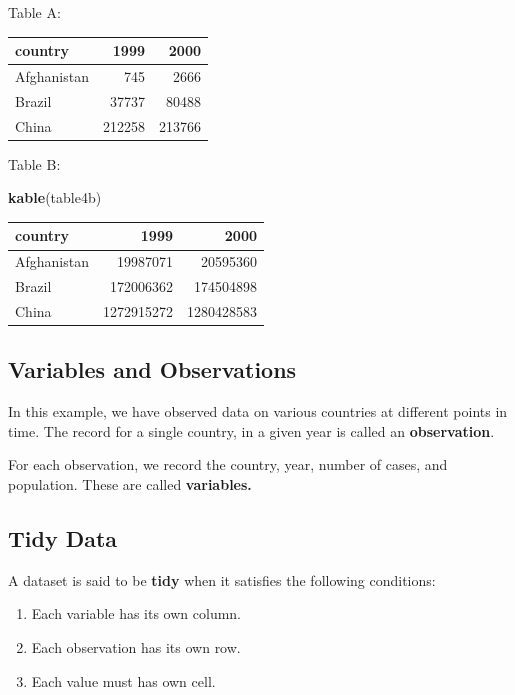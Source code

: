 \documentclass[]{book}
\newenvironment{Shaded}{\begin{snugshade}}{\end{snugshade}}
\newcommand{\KeywordTok}[1]{\textcolor[rgb]{0.13,0.29,0.53}{\textbf{#1}}}
\newcommand{\NormalTok}[1]{#1}
\providecommand{\tightlist}{%
  \setlength{\itemsep}{0pt}\setlength{\parskip}{0pt}}
\begin{document}
Table A:

\begin{tabular}{l|r|r}
\hline
country & 1999 & 2000\\
\hline
Afghanistan & 745 & 2666\\
\hline
Brazil & 37737 & 80488\\
\hline
China & 212258 & 213766\\
\hline
\end{tabular}

Table B:

\begin{Shaded}
\begin{Highlighting}[]
\KeywordTok{kable}\NormalTok{(table4b)}
\end{Highlighting}
\end{Shaded}

\begin{tabular}{l|r|r}
\hline
country & 1999 & 2000\\
\hline
Afghanistan & 19987071 & 20595360\\
\hline
Brazil & 172006362 & 174504898\\
\hline
China & 1272915272 & 1280428583\\
\hline
\end{tabular}

\subsection{Variables and
Observations}\label{variables-and-observations}

In this example, we have observed data on various countries at different
points in time. The record for a single country, in a given year is
called an \textbf{observation}.

For each observation, we record the country, year, number of cases, and
population. These are called \textbf{variables.}

\subsection{Tidy Data}\label{tidy-data-1}

A dataset is said to be \textbf{tidy} when it satisfies the following
conditions:

\begin{enumerate}
\def\labelenumi{\arabic{enumi}.}
\tightlist
\item
  Each variable has its own column.\\
\item
  Each observation has its own row.\\
\item
  Each value must has own cell.
\end{enumerate}
\end{document}
